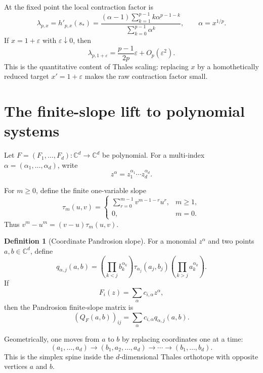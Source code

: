 \documentclass[11pt]{article}
\theoremstyle{definition}
\newtheorem{definition}[theorem]{Definition}
\theoremstyle{remark}
\newcommand{\C}{\mathbb{C}}
\begin{document}
At the fixed point the local contraction factor is
\begin{equation}\label{eq:lambda}
        \lambda_{p,x}=h'_{p,x}(s_*)
        =\frac{(\alpha-1)\sum_{k=1}^{p-1}k\alpha^{p-1-k}}
        {\sum_{k=0}^{p-1}\alpha^k},
        \qquad \alpha=x^{1/p}.
\end{equation}
If $x=1+\varepsilon$ with $\varepsilon\downarrow 0$, then
\begin{equation}\label{eq:lambda-small}
        \lambda_{p,1+\varepsilon}
        =\frac{p-1}{2p}\varepsilon+O_p(\varepsilon^2).
\end{equation}
This is the quantitative content of Thales scaling: replacing $x$ by a homothetically reduced target $x'=1+\varepsilon$ makes the raw contraction factor small.

\section{The finite-slope lift to polynomial systems}

Let $F=(F_1,\dots,F_d):\C^d\to\C^d$ be polynomial.  For a multi-index $\alpha=(\alpha_1,\dots,\alpha_d)$, write
\[
        z^\alpha=z_1^{\alpha_1}\cdots z_d^{\alpha_d}.
\]

For $m\geq 0$, define the finite one-variable slope
\[
        \tau_m(u,v)=
        \begin{cases}
        \displaystyle\sum_{r=0}^{m-1} v^{m-1-r}u^r,&m\geq 1,\\[0.7em]
        0,&m=0.
        \end{cases}
\]
Thus $v^m-u^m=(v-u)\tau_m(u,v)$.

\begin{definition}[Coordinate Pandrosion slope]\label{def:Q}
For a monomial $z^\alpha$ and two points $a,b\in\C^d$, define
\begin{equation}\label{eq:q-alpha-j}
        q_{\alpha,j}(a,b)
        =\left(\prod_{k<j} b_k^{\alpha_k}\right)
         \tau_{\alpha_j}(a_j,b_j)
         \left(\prod_{k>j} a_k^{\alpha_k}\right).
\end{equation}
If
\[
        F_i(z)=\sum_\alpha c_{i,\alpha}z^\alpha,
\]
then the Pandrosion finite-slope matrix is
\begin{equation}\label{eq:Q-def}
        (Q_F(a,b))_{ij}=
        \sum_\alpha c_{i,\alpha}q_{\alpha,j}(a,b).
\end{equation}
\end{definition}

Geometrically, one moves from $a$ to $b$ by replacing coordinates one at a time:
\[
        (a_1,\dots,a_d)\to(b_1,a_2,\dots,a_d)\to\cdots\to(b_1,\dots,b_d).
\]
This is the simplex spine inside the $d$-dimensional Thales orthotope with opposite vertices $a$ and $b$.
\end{document}
